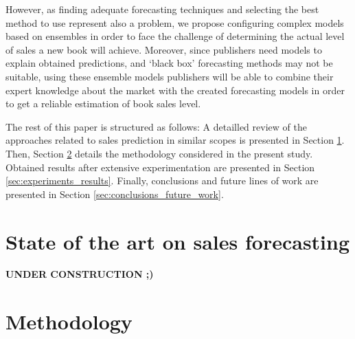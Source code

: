 \documentclass[a4paper,10pt,twocolumn,preprint,3p]{elsarticle}
\begin{document}
However, as finding adequate forecasting techniques and selecting the best method 
to use represent also a problem, we propose configuring complex models based on
ensembles \cite{Qiu2014} in order to face the challenge of determining the actual 
level of sales a new book will achieve.
Moreover, since publishers need models to explain obtained predictions, and 
`black box' forecasting methods may not be suitable, using these ensemble 
models publishers will be able to combine their expert knowledge about the 
market with the created forecasting models in order to get a reliable estimation 
of book sales level.


The rest of this paper is structured as follows: 
A detailled review of the approaches related to sales prediction in similar scopes is presented in Section \ref{sec:soa}.
Then, Section \ref{sec:methodology} details the methodology considered in the present study. 
Obtained results after extensive experimentation are presented in Section \ref{sec:experiments_results}.
Finally, conclusions and future lines of work are presented in Section \ref{sec:conclusions_future_work}.


\section{State of the art on sales forecasting} 
\label{sec:soa}

\textbf{UNDER CONSTRUCTION ;) }


\section{Methodology}
\label{sec:methodology}
\end{document}
